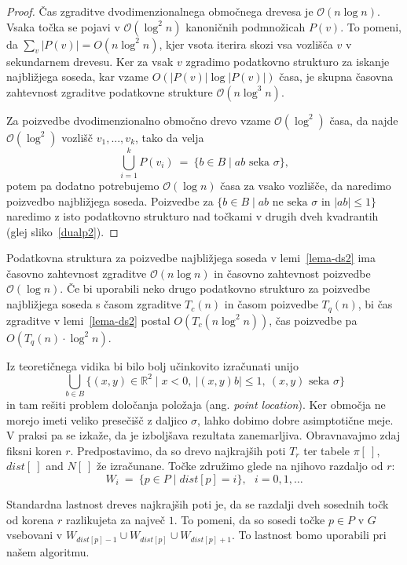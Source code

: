 \documentclass[a4paper, 12pt]{book}
\newcommand{\RR}{\ensuremath{\mathbb R}}  %
\newcommand{\OO}{\ensuremath{\mathcal{O}}} %
\def\dist{\mathit{dist}}
\begin{document}
\begin{proof}
Čas zgraditve dvodimenzionalnega območnega drevesa je $\OO(n\log n)$. Vsaka točka se pojavi v $\OO(\log^2n)$ kanoničnih podmnožicah $P(v)$. To pomeni, da $\sum_v |P(v)| = O( n\log^2 n)$, kjer vsota iterira skozi vsa vozlišča $v$ v sekundarnem drevesu. Ker za vsak $v$ zgradimo podatkovno strukturo za iskanje najbližjega soseda, kar vzame $O(|P(v)| \log |P(v)|)$ časa, je skupna časovna zahtevnost zgraditve podatkovne strukture $\OO(n\log^3n)$.

Za poizvedbe dvodimenzionalno območno drevo vzame $\OO(\log^2)$ časa, da  najde $\OO(\log^2)$ vozlišč $v_1,...,v_k$, tako da velja
\[
		\bigcup_{i=1}^k P(v_i) ~=~ \{ b\in B \mid \text{$ab$ seka $\sigma$}\},
\]
potem pa dodatno potrebujemo $\OO(\log n)$ časa za vsako vozlišče, da naredimo poizvedbo najbližjega soseda. Poizvedbe za $\{ b\in B \mid \text{$ab$ ne seka $\sigma$ in $|ab|\le 1$}\}$ naredimo z isto podatkovno strukturo nad točkami v drugih dveh kvadrantih (glej sliko~\ref{dualp2}).
\end{proof}

Podatkovna struktura za poizvedbe najbližjega soseda v lemi~\ref{lema-ds2} ima časovno zahtevnost zgraditve $\OO(n\log n)$ in časovno zahtevnost poizvedbe $\OO(\log n)$. Če bi uporabili neko drugo podatkovno strukturo za poizvedbe najbližjega soseda s časom zgraditve $T_c(n)$ in časom poizvedbe $T_q(n)$, bi čas zgraditve v lemi~\ref{lema-ds2} postal $O(T_c(n\log^2 n))$, čas poizvedbe pa $O(T_q(n)\cdot \log^2 n)$.

Iz teoretičnega vidika bi bilo bolj učinkovito izračunati unijo
\[
	\bigcup_{b\in B} \{ (x,y)\in \RR^2\mid x<0,~ |(x,y)b|\le 1,~ (x,y) 
			\text{ seka } \sigma \}
\]
in tam rešiti problem določanja položaja (ang. \textit{point location}). Ker območja ne morejo imeti veliko presečišč z daljico $\sigma$, lahko dobimo dobre asimptotične meje. V praksi pa se izkaže, da je izboljšava rezultata zanemarljiva.
\bigbreak
Obravnavajmo zdaj fiksni koren $r$. Predpostavimo, da so drevo najkrajših poti $T_r$ ter tabele $\pi[~]$, $\dist[~]$ and $N[~]$ že izračunane. Točke združimo glede na njihovo razdaljo od $r$:
\[
	W_i ~=~ \{ p\in P \mid \dist[p]=i \},~~~ i=0,1,\dots
\]

Standardna lastnost dreves najkrajših poti je, da se razdalji dveh sosednih točk od korena $r$ razlikujeta za največ $1$. To pomeni, da so sosedi točke $p\in P$ v $G$ vsebovani v $W_{\dist[p]-1}\cup W_{\dist[p]} \cup W_{\dist[p]+1}$. To lastnost bomo uporabili pri našem algoritmu.
\end{document}
